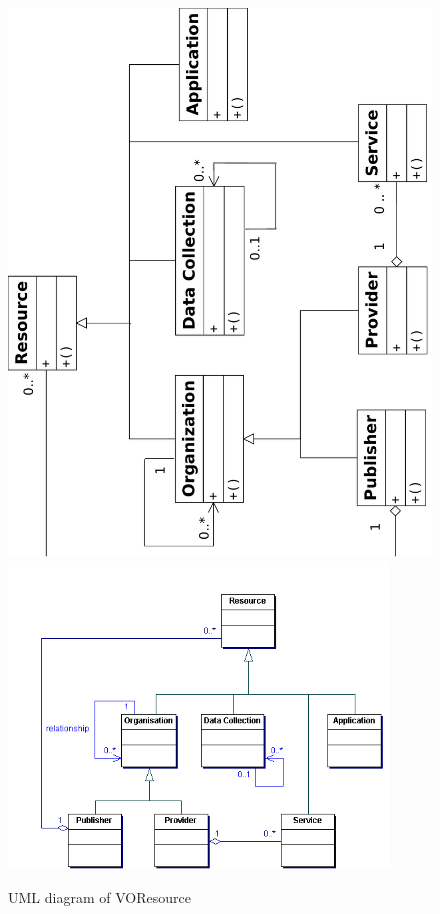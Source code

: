     \begin{figure}[!htbp]
      \begin{center}
        \leavevmode
        \ifpdf
        \includegraphics[height=0.9\textwidth, angle=-90]{../resources}
        \else
        \includegraphics[width=0.9\textwidth]{resource.png}
        \fi
      \end{center}
        \caption{UML diagram of VOResource}
        \label{FigResource}
    \end{figure}

\clearpage

